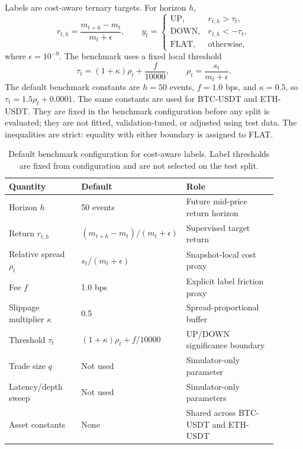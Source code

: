 \documentclass[conference]{IEEEtran}
\begin{document}
Labels are cost-aware ternary targets. For horizon $h$,
\begin{equation}
r_{t,h}=\frac{m_{t+h}-m_t}{m_t+\epsilon},\qquad
 y_t=\begin{cases}
\mathrm{UP}, & r_{t,h}>\tau_t,\\
\mathrm{DOWN}, & r_{t,h}< -\tau_t,\\
\mathrm{FLAT}, & \mathrm{otherwise},
\end{cases}
\end{equation}
where $\epsilon=10^{-9}$. The benchmark uses a fixed local threshold
\begin{equation}
\tau_t=(1+\kappa)\rho_t+\frac{f}{10000},\qquad
\rho_t=\frac{s_t}{m_t+\epsilon}.
\label{eq:label_threshold}
\end{equation}
The default benchmark constants are $h=50$ events, $f=1.0$ bps, and $\kappa=0.5$, so $\tau_t=1.5\rho_t+0.0001$. The same constants are used for BTC-USDT and ETH-USDT. They are fixed in the benchmark configuration before any split is evaluated; they are not fitted, validation-tuned, or adjusted using test data. The inequalities are strict: equality with either boundary is assigned to FLAT.

\begin{table}[t]
\centering
\caption{Default benchmark configuration for cost-aware labels. Label thresholds are fixed from configuration and are not selected on the test split.}
\label{tab:benchmark_config}
\scriptsize
\begin{tabular}{@{}p{0.27\linewidth}p{0.29\linewidth}p{0.34\linewidth}@{}}
\toprule
Quantity & Default & Role \\
\midrule
Horizon $h$ & 50 events & Future mid-price return horizon \\
Return $r_{t,h}$ & $(m_{t+h}-m_t)/(m_t+\epsilon)$ & Supervised target return \\
Relative spread $\rho_t$ & $s_t/(m_t+\epsilon)$ & Snapshot-local cost proxy \\
Fee $f$ & 1.0 bps & Explicit label friction proxy \\
Slippage multiplier $\kappa$ & 0.5 & Spread-proportional buffer \\
Threshold $\tau_t$ & $(1+\kappa)\rho_t+f/10000$ & UP/DOWN significance boundary \\
Trade size $q$ & Not used & Simulator-only parameter \\
Latency/depth sweep & Not used & Simulator-only parameters \\
Asset constants & None & Shared across BTC-USDT and ETH-USDT \\
\bottomrule
\end{tabular}
\end{table}
\end{document}
